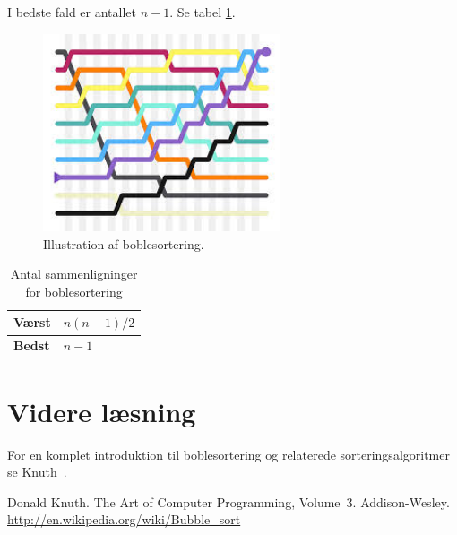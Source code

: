 \documentclass[a4paper]{article}
\begin{document}
I bedste fald er antallet $n-1$. Se tabel \ref{tab:vb}.

\begin{figure}[h!]
    \centering
    \includegraphics[width=7cm]{bs.jpeg}
    \caption{Illustration af boblesortering.}
    \label{fig:bubblesorting}
\end{figure}

\begin{table}[h!]
    \centering
        \begin{tabular}{|l|l|}
            \hline
            \textbf{Værst} & $n(n-1)/2$ \\ \hline
            \textbf{Bedst} & $n-1$ \\ \hline
        \end{tabular}
    \caption{Antal sammenligninger for boblesortering}
    \label{tab:vb}
\end{table}

\section{Videre læsning}
For en komplet introduktion til boblesortering og relaterede sorteringsalgoritmer se Knuth~\cite{ComArt}.

\begin{thebibliography}{99}
Donald Knuth. The Art of Computer Programming, Volume~3. Addison-Wesley.
 \url{http://en.wikipedia.org/wiki/Bubble\_sort}
\end{thebibliography}
\end{document}
